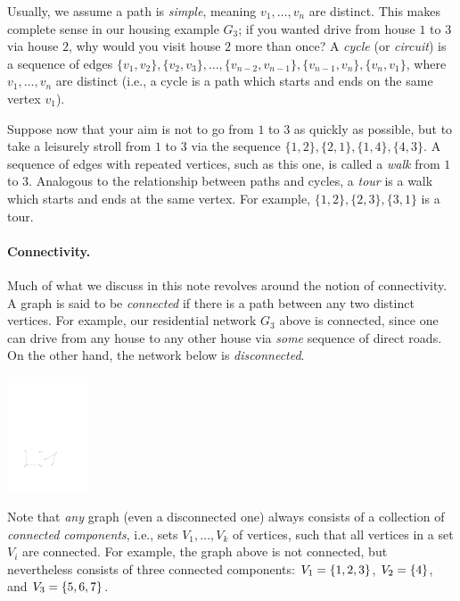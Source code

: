\documentclass[11pt]{article}
\begin{document}
Usually, we assume a path is {\it simple\/}, meaning $v_1,\ldots,v_n$ are distinct. This makes complete sense in our housing example $G_3$; if you wanted drive from house $1$ to $3$ via house $2$, why would you visit house $2$ more than once? A {\it cycle\/} (or
{\it circuit\/}) is a sequence of
edges $\{v_1,v_2\},\{v_2,v_3\},\ldots,\{v_{n-2},v_{n-1}\},\{v_{n-1},v_n\},\{v_n,v_1\}$, where $v_1,\ldots,v_n$ are distinct (i.e., a cycle is a path which starts and ends on the same vertex $v_1$).


Suppose now that your aim is not to go from $1$ to $3$ as quickly as possible, but to take a leisurely stroll from $1$ to $3$ via the sequence $\{1,2\},\{2,1\},\{1,4\},\{4,3\}$. A sequence of edges with repeated vertices, such as this one, is called a \emph{walk} from $1$ to $3$. Analogous to the relationship between paths and cycles, a {\it tour\/} is a walk which starts and ends at the same vertex. For example, $\{1,2\},\{2,3\}, \{3,1\}$ is a tour.

\paragraph{Connectivity.} Much of what we discuss in this note revolves around the notion of connectivity. A graph is said to be {\it connected\/} if there is a path between any two distinct vertices. For example, our residential network $G_3$ above is connected, since one can drive from any house to any other house via \emph{some} sequence of direct roads. On the other hand, the network below is \emph{disconnected}.

\begin{center}
\includegraphics[height=3.4cm]{graph3.pdf}
\end{center}


Note that \emph{any} graph (even a disconnected one) always consists of a collection of \emph{connected components}, i.e., sets $V_1,\dots,V_k$ of vertices, such that all vertices in a set $V_i$ are connected. For example, the graph above is not connected, but nevertheless consists of three connected components: $V_1={\left\{1,2,3\right\}}$, $V_2={\left\{4\right\}}$, and $V_3={\left\{5,6,7\right\}}$.
\end{document}
